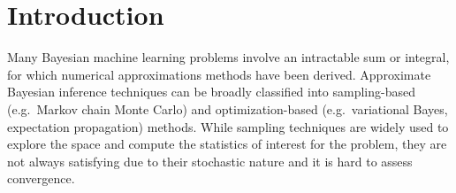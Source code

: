 \documentclass[reqno,oneside,letterpaper,10pt]{article}
\newcommand{\Holder}{H\"older\xspace}
\newcommand{\red}[1]{{\color{red}#1}}
\begin{document}
%
%
%
%
%
%
%
%
%


\section{Introduction}
Many Bayesian machine learning problems involve an intractable sum or integral, for which
numerical approximations methods have been derived. Approximate Bayesian inference techniques can be broadly classified into sampling-based (e.g.~Markov chain Monte Carlo) and optimization-based (e.g.~variational Bayes, expectation propagation) methods.
While sampling techniques
are widely used to explore the space and compute the %
statistics  of
interest for the problem, they are not always satisfying due to their stochastic
nature and it is hard to assess convergence. %
\end{document}
